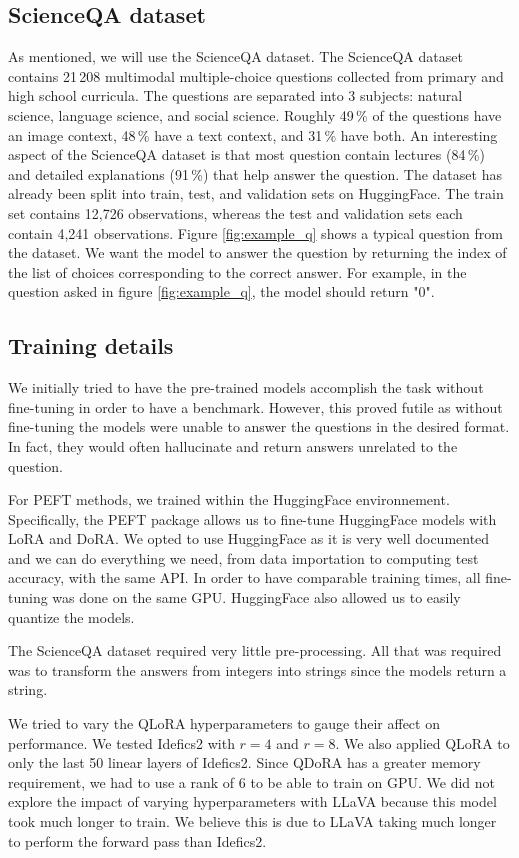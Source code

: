 \documentclass{article}
\begin{document}
\subsection{ScienceQA dataset}
As mentioned, we will use the ScienceQA dataset. The ScienceQA dataset contains 21\,208 multimodal multiple-choice questions collected from primary and high school curricula. The questions are separated into 3 subjects: natural science, language science, and social science. Roughly 49\,\% of the questions have an image context, 48\,\% have a text context, and 31\,\% have both. An interesting aspect of the ScienceQA dataset is that most question contain lectures (84\,\%) and detailed explanations (91\,\%) that help answer the question. The dataset has already been split into train, test, and validation sets on HuggingFace. The train set contains 12,726 observations, whereas the test and validation sets each contain 4,241 observations. Figure \ref{fig:example_q} shows a typical question from the dataset. We want the model to answer the question by returning the index of the list of choices corresponding to the correct answer. For example, in the question asked in figure \ref{fig:example_q}, the model should return "0".

\subsection{Training details}

We initially tried to have the pre-trained models accomplish the task without fine-tuning in order to have a benchmark. However, this proved futile as without fine-tuning the models were unable to answer the questions in the desired format. In fact, they would often hallucinate and return answers unrelated to the question.

For PEFT methods, we trained within the HuggingFace environnement. Specifically, the PEFT package allows us to fine-tune HuggingFace models with LoRA and DoRA. We opted to use HuggingFace as it is very well documented and we can do everything we need, from data importation to computing test accuracy, with the same API. In order to have comparable training times, all fine-tuning was done on the same GPU. HuggingFace also allowed us to easily quantize the models.

The ScienceQA dataset required very little pre-processing. All that was required was to transform the answers from integers into strings since the models return a string.

We tried to vary the QLoRA hyperparameters to gauge their affect on performance. We tested Idefics2 with $r=4$ and $r=8$. We also applied QLoRA to only the last 50 linear layers of Idefics2. Since QDoRA has a greater memory requirement, we had to use a rank of 6 to be able to train on GPU. We did not explore the impact of varying hyperparameters with LLaVA because this model took much longer to train. We believe this is due to LLaVA taking much longer to perform the forward pass than Idefics2.
\end{document}
